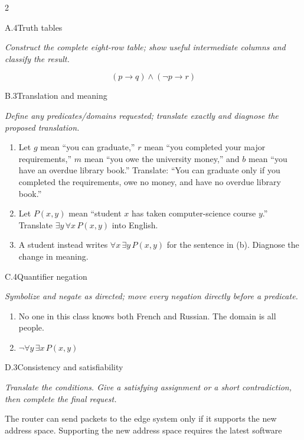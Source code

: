 \documentclass[9pt]{extarticle}
\begin{document}
\begin{multicols}{2}
\begin{CoreProblem}{A.4}{Truth tables}
{\scriptsize\textit{Construct the complete eight-row table; show useful intermediate columns and classify the result.}\par}
\[
  (p\to q)\land(\neg p\to r)
\]
\end{CoreProblem}
\begin{CoreProblem}{B.3}{Translation and meaning}
{\scriptsize\textit{Define any predicates/domains requested; translate exactly and diagnose the proposed translation.}\par}
\begin{enumerate}[label=(\alph*)]
  \item Let $g$ mean ``you can graduate,'' $r$ mean ``you completed your major
        requirements,'' $m$ mean ``you owe the university money,'' and $b$
        mean ``you have an overdue library book.'' Translate: ``You can
        graduate only if you completed the requirements, owe no money, and
        have no overdue library book.''
  \item Let $P(x,y)$ mean ``student $x$ has taken computer-science course
        $y$.'' Translate $\exists y\,\forall x\,P(x,y)$ into English.
  \item A student instead writes $\forall x\,\exists y\,P(x,y)$ for the
        sentence in (b). Diagnose the change in meaning.
\end{enumerate}
\end{CoreProblem}
\begin{CoreProblem}{C.4}{Quantifier negation}
{\scriptsize\textit{Symbolize and negate as directed; move every negation directly before a predicate.}\par}
\begin{enumerate}[label=(\alph*)]
  \item No one in this class knows both French and Russian. The domain is all
        people.
  \item $\neg\forall y\,\exists x\,P(x,y)$
\end{enumerate}
\end{CoreProblem}
\columnbreak
\begin{CoreProblem}{D.3}{Consistency and satisfiability}
{\scriptsize\textit{Translate the conditions. Give a satisfying assignment or a short contradiction, then complete the final request.}\par}
The router can send packets to the edge system only if it supports the new
address space. Supporting the new address space requires the latest software

\end{CoreProblem}
\end{multicols}
\end{document}
